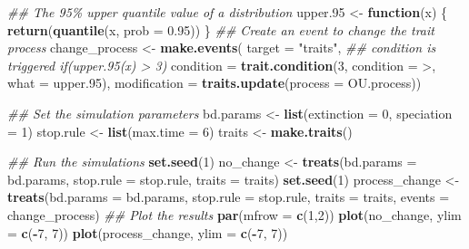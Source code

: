 \documentclass[
]{book}
\newenvironment{Shaded}{\begin{snugshade}}{\end{snugshade}}
\newcommand{\CommentTok}[1]{\textcolor[rgb]{0.56,0.35,0.01}{\textit{#1}}}
\newcommand{\ControlFlowTok}[1]{\textcolor[rgb]{0.13,0.29,0.53}{\textbf{#1}}}
\newcommand{\DataTypeTok}[1]{\textcolor[rgb]{0.13,0.29,0.53}{#1}}
\newcommand{\DecValTok}[1]{\textcolor[rgb]{0.00,0.00,0.81}{#1}}
\newcommand{\FloatTok}[1]{\textcolor[rgb]{0.00,0.00,0.81}{#1}}
\newcommand{\KeywordTok}[1]{\textcolor[rgb]{0.13,0.29,0.53}{\textbf{#1}}}
\newcommand{\NormalTok}[1]{#1}
\newcommand{\OperatorTok}[1]{\textcolor[rgb]{0.81,0.36,0.00}{\textbf{#1}}}
\newcommand{\StringTok}[1]{\textcolor[rgb]{0.31,0.60,0.02}{#1}}
\begin{document}
\begin{Shaded}
\begin{Highlighting}[]
\CommentTok{\#\# The 95\% upper quantile value of a distribution}
\NormalTok{upper}\FloatTok{.95}\NormalTok{ \textless{}{-}}\StringTok{ }\ControlFlowTok{function}\NormalTok{(x) \{}
    \KeywordTok{return}\NormalTok{(}\KeywordTok{quantile}\NormalTok{(x, }\DataTypeTok{prob =} \FloatTok{0.95}\NormalTok{))}
\NormalTok{\} }
\CommentTok{\#\# Create an event to change the trait process}
\NormalTok{change\_process \textless{}{-}}\StringTok{ }\KeywordTok{make.events}\NormalTok{(}
                  \DataTypeTok{target =} \StringTok{"traits"}\NormalTok{,}
                  \CommentTok{\#\# condition is triggered if(upper.95(x) \textgreater{} 3)}
                  \DataTypeTok{condition =} \KeywordTok{trait.condition}\NormalTok{(}\DecValTok{3}\NormalTok{, }\DataTypeTok{condition =} \StringTok{\textasciigrave{}}\DataTypeTok{\textgreater{}}\StringTok{\textasciigrave{}}\NormalTok{, }\DataTypeTok{what =}\NormalTok{ upper}\FloatTok{.95}\NormalTok{),}
                  \DataTypeTok{modification =} \KeywordTok{traits.update}\NormalTok{(}\DataTypeTok{process =}\NormalTok{ OU.process))}

\CommentTok{\#\# Set the simulation parameters}
\NormalTok{bd.params \textless{}{-}}\StringTok{ }\KeywordTok{list}\NormalTok{(}\DataTypeTok{extinction =} \DecValTok{0}\NormalTok{, }\DataTypeTok{speciation =} \DecValTok{1}\NormalTok{)}
\NormalTok{stop.rule \textless{}{-}}\StringTok{ }\KeywordTok{list}\NormalTok{(}\DataTypeTok{max.time =} \DecValTok{6}\NormalTok{)}
\NormalTok{traits    \textless{}{-}}\StringTok{ }\KeywordTok{make.traits}\NormalTok{()}

\CommentTok{\#\# Run the simulations}
\KeywordTok{set.seed}\NormalTok{(}\DecValTok{1}\NormalTok{)}
\NormalTok{no\_change \textless{}{-}}\StringTok{ }\KeywordTok{treats}\NormalTok{(}\DataTypeTok{bd.params =}\NormalTok{ bd.params,}
                  \DataTypeTok{stop.rule =}\NormalTok{ stop.rule,}
                  \DataTypeTok{traits =}\NormalTok{ traits)}
\KeywordTok{set.seed}\NormalTok{(}\DecValTok{1}\NormalTok{)}
\NormalTok{process\_change \textless{}{-}}\StringTok{ }\KeywordTok{treats}\NormalTok{(}\DataTypeTok{bd.params =}\NormalTok{ bd.params,}
                       \DataTypeTok{stop.rule =}\NormalTok{ stop.rule,}
                       \DataTypeTok{traits =}\NormalTok{ traits,}
                       \DataTypeTok{events =}\NormalTok{ change\_process)}
\CommentTok{\#\# Plot the results}
\KeywordTok{par}\NormalTok{(}\DataTypeTok{mfrow =} \KeywordTok{c}\NormalTok{(}\DecValTok{1}\NormalTok{,}\DecValTok{2}\NormalTok{))}
\KeywordTok{plot}\NormalTok{(no\_change, }\DataTypeTok{ylim =} \KeywordTok{c}\NormalTok{(}\OperatorTok{{-}}\DecValTok{7}\NormalTok{, }\DecValTok{7}\NormalTok{))}
\KeywordTok{plot}\NormalTok{(process\_change, }\DataTypeTok{ylim =} \KeywordTok{c}\NormalTok{(}\OperatorTok{{-}}\DecValTok{7}\NormalTok{, }\DecValTok{7}\NormalTok{))}
\end{Highlighting}
\end{Shaded}
\end{document}
